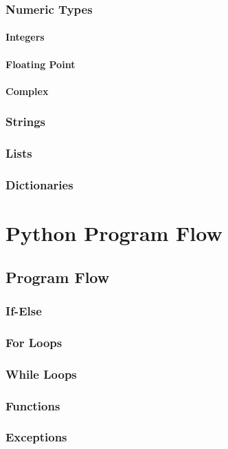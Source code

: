 \documentclass{book}
\begin{document}
\section{Numeric Types}
\subsection{Integers}
\subsection{Floating Point}
\subsection{Complex}

\section{Strings}
\section{Lists}
\section{Dictionaries}



\part{Python Program Flow}

\chapter{Program Flow}
\section{If-Else}
\section{For Loops}
\section{While Loops}
\section{Functions}
\section{Exceptions}
\end{document}
